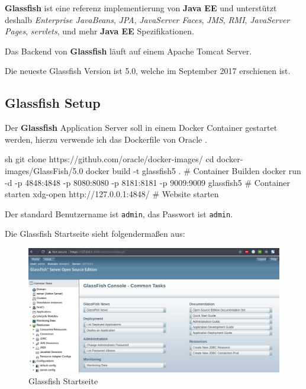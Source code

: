 \textbf{Glassfish} ist eine referenz implementierung von \textbf{Java EE} und unterstützt deshalb \textit{Enterprise JavaBeans}, \textit{JPA}, \textit{JavaServer Faces}, \textit{JMS}, \textit{RMI}, \textit{JavaServer Pages}, \textit{servlets}, und mehr \textbf{Java EE} Spezifikationen.

Das Backend von \textbf{Glassfish} läuft auf einem Apache Tomcat Server.

Die neueste Glassfish Version ist 5.0, welche im September 2017 erschienen ist.

\subsection{Glassfish Setup}

Der \textbf{Glassfish} Application Server soll in einem Docker Container gestartet werden, hierzu verwende ich das Dockerfile von Oracle \cite{github:oracle-docker-images}.

\begin{code}{sh}
    git clone https://github.com/oracle/docker-images/
    cd docker-images/GlassFish/5.0
    docker build -t glassfish5 .  # Container Builden
    docker run -d -p 4848:4848 -p 8080:8080 -p 8181:8181 -p 9009:9009 glassfish5  # Container starten
    xdg-open http://127.0.0.1:4848/  # Website starten
\end{code}

Der standard Benutzername ist \texttt{admin}, das Passwort ist \texttt{admin}.

Die Glassfish Startseite sieht folgendermaßen aus:

\begin{figure}
    \centering
    \includegraphics[width=\textwidth]{images/glassfish-home}
    \caption{Glassfish Startseite}
\end{figure}




